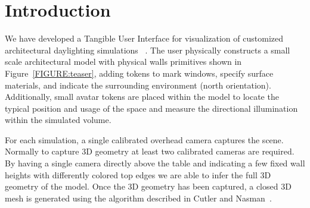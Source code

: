 \documentclass[10pt,twocolumn,letterpaper]{article}
\begin{document}
\section{Introduction}




\vspace{-0.05in}
We have developed a Tangible User Interface for visualization of
customized architectural daylighting simulations ~\cite{ShengYYC09, sheng_TVCG}. 
The user physically
constructs a small scale architectural model with physical walls
primitives shown in Figure~\ref{FIGURE:teaser}, adding tokens to mark
windows, specify surface materials, and indicate the surrounding
environment (north orientation).
%
Additionally, small avatar tokens are placed within the model to
locate the typical position and usage of the space and measure the
directional illumination within the simulated volume.


For each simulation, a single calibrated overhead camera captures the
scene.  Normally to capture 3D geometry at least two calibrated
cameras are required.  By having a single camera directly above the
table and indicating a few fixed wall heights with differently colored
top edges we are able to infer the full 3D geometry of the model.
Once the 3D geometry has been captured, a closed 3D mesh is generated
using the algorithm described in Cutler and Nasman~\cite{aag201015}.
\end{document}
